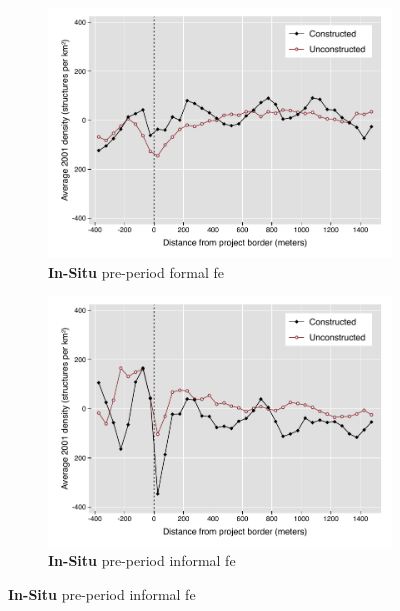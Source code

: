 \documentclass[12pt]{article}
\begin{document}
\begin{figure}
\begin{subfigure}[b]{0.48\textwidth}
        \end{subfigure}
        \begin{subfigure}[b]{0.48\textwidth}
                    \caption[Network2]%
            {{\footnotesize \textbf{In-Situ} pre-period formal fe }}   
            \label{fig:prefor}
            \centering
            \includegraphics[width=\textwidth,trim={0.3cm .3cm 0.1cm 0cm}, clip=true]{figures/bblu_for_fe_pre_means_4_2_sp_postk.pdf}

        \end{subfigure}
        \hfill
        \begin{subfigure}[b]{0.48\textwidth}  
                    \caption[]%
            {{\footnotesize \textbf{In-Situ} pre-period informal fe }}     
            \label{fig:preinf}
            \centering 
            \includegraphics[width=\textwidth,trim={0.3cm .3cm 0.1cm 0cm}, clip=true]{figures/bblu_inf_fe_pre_means_4_2_sp_postk.pdf}


\end{subfigure}
\end{figure}
\end{document}
